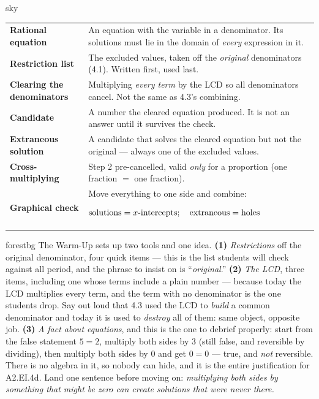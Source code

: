 \documentclass[10pt]{article}
\newcommand{\TallMath}[1]{$\displaystyle #1\rule[-1.4em]{0pt}{3.2em}$}
\begin{document}
\begin{skillbox}{sky}
\renewcommand{\arraystretch}{1.3}
\begin{tabularx}{\linewidth}{@{}l X@{}}
\textbf{Rational equation} & An equation with the variable in a denominator. Its solutions must lie in the domain of \emph{every} expression in it. \\
\textbf{Restriction list} & The excluded values, taken off the \emph{original} denominators (4.1). Written first, used last. \\
\textbf{Clearing the denominators} & Multiplying \emph{every term} by the LCD so all denominators cancel. Not the same as 4.3's combining. \\
\textbf{Candidate} & A number the cleared equation produced. It is not an answer until it survives the check. \\
\textbf{Extraneous solution} & A candidate that solves the cleared equation but not the original --- always one of the excluded values. \\
\textbf{Cross-multiplying} & Step 2 pre-cancelled, valid \emph{only} for a proportion (one fraction $=$ one fraction). \\
\textbf{Graphical check} & Move everything to one side and combine: \TallMath{\text{solutions}=x\text{-intercepts}; \quad \text{extraneous}=\text{holes}} \\
\end{tabularx}
\end{skillbox}

\begin{fixedskillbox}{forestbg}
    The Warm-Up sets up two tools and one idea. \textbf{(1)} \emph{Restrictions} off the original
    denominator, four quick items --- this is the list students will check against all period, and the
    phrase to insist on is ``\emph{original}.'' \textbf{(2)} \emph{The LCD}, three items, including one
    whose terms include a plain number --- because today the LCD multiplies every term, and the term
    with no denominator is the one students drop. Say out loud that 4.3 used the LCD to \emph{build} a
    common denominator and today it is used to \emph{destroy} all of them: same object, opposite job.
    \textbf{(3)} \emph{A fact about equations}, and this is the one to debrief properly: start from the
    false statement $5=2$, multiply both sides by $3$ (still false, and reversible by dividing), then
    multiply both sides by $0$ and get $0=0$ --- true, and \emph{not} reversible. There is no algebra in
    it, so nobody can hide, and it is the entire justification for A2.EI.4d. Land one sentence before
    moving on: \emph{multiplying both sides by something that might be zero can create solutions that
    were never there.}
\end{fixedskillbox}
\end{document}

